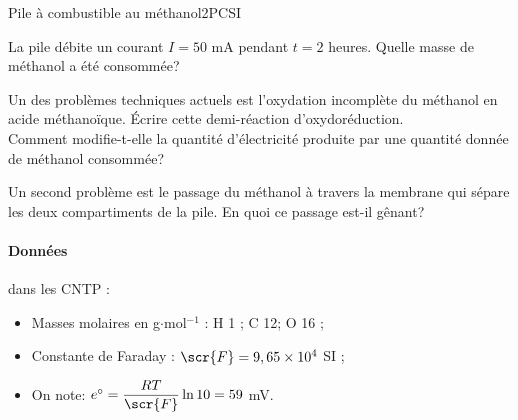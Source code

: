 \begin{exercise}{Pile à combustible au méthanol}{2}{PCSI}
\begin{questions}
\question La pile débite un courant $I = 50$ mA pendant $t = 2$ heures. Quelle masse de méthanol a été consommée?

\question Un des problèmes techniques actuels est l’oxydation incomplète du méthanol en acide méthanoïque. Écrire cette demi-réaction d’oxydoréduction. \\
Comment modifie-t-elle la quantité d’électricité produite par une quantité donnée de méthanol consommée?

\question Un second problème est le passage du méthanol à travers la membrane qui sépare les deux compartiments de la pile. En quoi ce passage est-il gênant?

\end{questions}

\paragraph{Données} dans les CNTP :
\begin{itemize}
    \item Masses molaires en g$\cdot$mol$^{-1}$ : H 1 ; C 12; O 16 ;
    \item Constante de Faraday : $\scr{F} = 9,65 \times 10^4$ SI ;
    \item On note: $e^\circ = \dfrac{RT}{\scr{F}} \ln10 = 59$ mV.
\end{itemize}


\end{exercise}

\newpage

